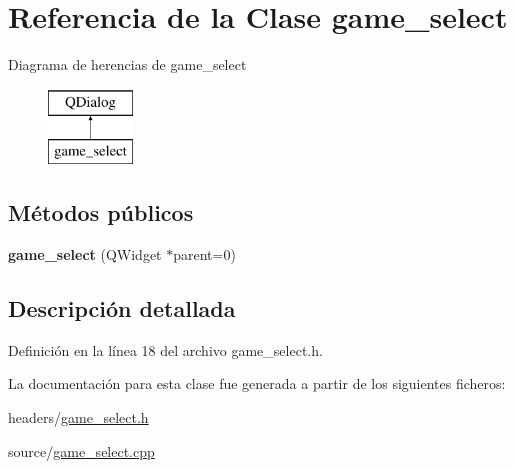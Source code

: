\hypertarget{classgame__select}{\section{Referencia de la Clase game\-\_\-select}
\label{classgame__select}
}
Diagrama de herencias de game\-\_\-select\begin{figure}[H]
\begin{center}
\leavevmode
\includegraphics[height=2.000000cm]{classgame__select}
\end{center}
\end{figure}
\subsection*{Métodos públicos}
\begin{DoxyCompactItemize}
\item 
\hypertarget{classgame__select_a2fa0dae60cdc46a56e4ffd941976cd88}{{\bfseries game\-\_\-select} (Q\-Widget $\ast$parent=0)}\label{classgame__select_a2fa0dae60cdc46a56e4ffd941976cd88}

\end{DoxyCompactItemize}


\subsection{Descripción detallada}


Definición en la línea 18 del archivo game\-\_\-select.\-h.



La documentación para esta clase fue generada a partir de los siguientes ficheros\-:\begin{DoxyCompactItemize}
\item 
headers/\hyperlink{game__select_8h}{game\-\_\-select.\-h}\item 
source/\hyperlink{game__select_8cpp}{game\-\_\-select.\-cpp}\end{DoxyCompactItemize}
